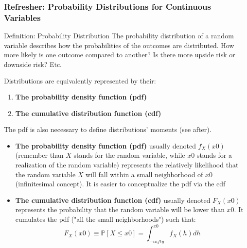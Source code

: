 \documentclass{beamer}
\begin{document}
\begin{frame}
  \frametitle{Refresher: Probability Distributions for Continuous Variables}
  
  \begin{block}{Definition: Probability Distribution}
    The probability distribution of a random variable describes how the probabilities of the outcomes are distributed. How more likely is one outcome compared to another? Is there more upside risk or downside risk? Etc.
  \end{block}

\medskip
  
  Distributions are equivalently represented by their:
  \begin{enumerate}
  \item \textbf{The probability density function (pdf)}
  \item \textbf{The cumulative distribution function (cdf)}  
  \end{enumerate}    
  
  The pdf is also necessary to define distributions' moments (see after).\\  
\end{frame}
  
\begin{frame}
  \begin{itemize}
  \item \textbf{The probability density function (pdf)} usually denoted $f_X(x0)$ (remember than $X$ stands for the random variable, while $x0$ stands for a realization of the random variable) represents the relatively likelihood that the random variable $X$ will fall within a small neighborhood of $x0$ (infinitesimal concept). It is easier to conceptualize the pdf via the cdf
  \item \textbf{The cumulative distribution function (cdf)} usually denoted $F_X(x0)$ represents the probability that the random variable will be lower than $x0$. It cumulates the pdf ("all the small neighborhoods") such that:
    \begin{equation*}
F_X(x0) \equiv \mathbb{P}[X \leq x0] = \int_{-infty}^{x0} f_X(h) dh      
    \end{equation*}    
  \end{itemize}  
\end{frame}
\end{document}

